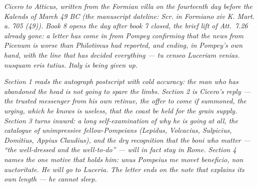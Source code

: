 
\textit{Cicero to Atticus, written from the Formian
villa on the fourteenth day before the Kalends of
March 49 BC (the manuscript dateline: \textit{Scr. in
Formiano xiv K. Mart. a. 705 (49)}). Book 8 opens the
day after book 7 closed, the brief lift of \textit{Att.}~7.26
already gone: a letter has come in from Pompey
confirming that the news from Picenum is worse than
Philotimus had reported, and ending, in Pompey's own
hand, with the line that has decided everything ---
\textit{tu censeo Luceriam venias. nusquam eris
tutius.} Italy is being given up.}

\textit{Section 1 reads the autograph postscript with
cold accuracy: the man who has abandoned the head is
not going to spare the limbs. Section 2 is Cicero's
reply --- the trusted messenger from his own
retinue, the offer to come if summoned, the urging,
which he knows is useless, that the coast be held for
the grain supply. Section 3 turns inward: a long
self-examination of why he is going at all, the
catalogue of unimpressive fellow-Pompeians
(Lepidus, Volcacius, Sulpicius, Domitius, Appius
Claudius), and the dry recognition that the
\textit{boni} who matter --- ``the well-dressed and
the well-to-do'' --- will in fact stay in Rome.
Section 4 names the one motive that holds him:
\textit{unus Pompeius me movet beneficio, non
auctoritate}. He will go to Luceria. The letter ends
on the note that explains its own length --- he
cannot sleep.}
